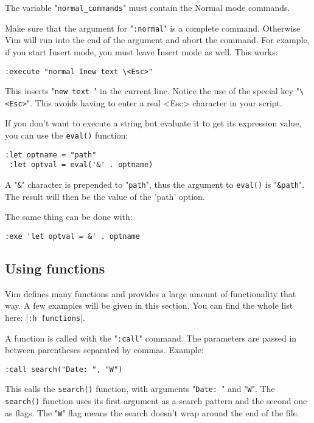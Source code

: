 The variable "\verb!normal_commands!" must contain the Normal mode commands.

Make sure that the argument for "\verb!:normal!" is a complete command.
Otherwise Vim will run into the end of the argument and abort the command.
For example, if you start Insert mode, you must leave Insert mode as well.
This works:

\begin{Verbatim}[samepage=true]
 :execute "normal Inew text \<Esc>"
\end{Verbatim}

This inserts "\verb!new text !" in the current line.
Notice the use of the special key "\verb!\<Esc>!".
This avoids having to enter a real <Esc> character in your script.

If you don't want to execute a string but evaluate it to get its expression value, you can use the \verb!eval()! function:

\begin{Verbatim}[samepage=true]
 :let optname = "path"
 :let optval = eval('&' . optname)
\end{Verbatim}

A "\verb!&!" character is prepended to "\verb!path!", thus the argument to \verb!eval()! is "\verb!&path!".
The result will then be the value of the 'path' option.

The same thing can be done with:

\begin{Verbatim}[samepage=true]
 :exe 'let optval = &' . optname
\end{Verbatim}

\subsection{Using functions}
Vim defines many functions and provides a large amount of functionality that way.
A few examples will be given in this section.
You can find the whole list here: |\verb!:h functions!|.

A function is called with the "\verb!:call!" command.
The parameters are passed in between parentheses separated by commas.
Example:

\begin{Verbatim}[samepage=true]
 :call search("Date: ", "W")
\end{Verbatim}

This calls the \verb!search()! function, with arguments "\verb!Date: !" and "\verb!W!".
The \verb!search()! function uses its first argument as a search pattern and the second one as flags.
The "\verb!W!" flag means the search doesn't wrap around the end of the file.

